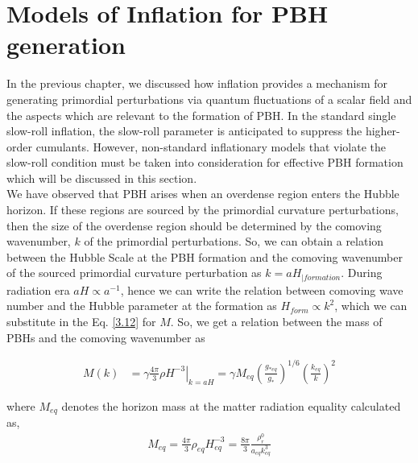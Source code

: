 \section{Models of Inflation for PBH generation}
In the previous chapter, we discussed how inflation provides a mechanism for generating primordial perturbations via quantum fluctuations of a scalar field and the aspects which are relevant to the formation of PBH. In the standard single slow-roll inflation, the slow-roll parameter is anticipated to suppress the higher-order cumulants. However, non-standard inflationary models that violate the slow-roll condition must be taken into consideration for effective PBH formation which will be discussed in this section.\\
We have observed that PBH arises when an overdense region enters the Hubble horizon. If these regions are sourced by the primordial curvature perturbations, then the size of the overdense region should be determined by the comoving wavenumber, $k$ of the primordial perturbations. So, we can obtain a relation between the Hubble Scale at the PBH formation and the comoving wavenumber of the sourced primordial curvature perturbation as $k =aH_{|formation}$.
During radiation era $aH \propto a^{-1}$, hence we can write the relation between comoving wave number and the Hubble parameter at the formation as $H_{form} \propto k^2$, which we can substitute in the Eq. \ref{3.12} for $M$. So, we get a relation between the mass of PBHs and the comoving wavenumber as \cite{Sasaki_2018}


\begin{align}
    M(k) & =\left.\gamma \frac{4 \pi}{3} \rho H^{-3}\right|_{k=a H} =\gamma M_{eq}\left(\frac{g_{* eq}}{g_*}\right)^{1 / 6}\left(\frac{k_{eq}}{k}\right)^2 \label{3.36}
\end{align}

where $M_{eq}$ denotes the horizon mass at the matter radiation equality calculated as,
\begin{align}
    M_{eq}=\frac{4 \pi}{3} \rho_{eq} H_{eq}^{-3}=\frac{8 \pi}{3} \frac{\rho_r^0}{a_{eq} k_{eq}^3} \label{3.37}
\end{align}

